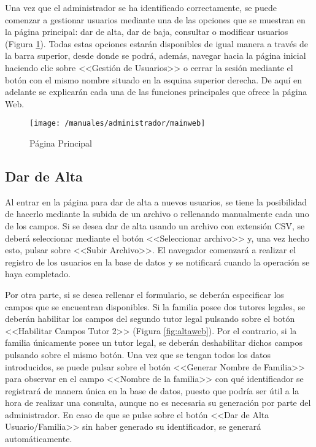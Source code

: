 Una vez que el administrador se ha identificado correctamente, se puede comenzar a gestionar usuarios mediante una de las opciones que se muestran en la página principal: dar de alta, dar de baja, consultar o modificar usuarios (Figura \ref{fig:indexweb}). Todas estas opciones estarán disponibles de igual manera a través de la barra superior, desde donde se podrá, además, navegar hacia la página inicial haciendo clic sobre <<Gestión de Usuarios>> o cerrar la sesión mediante el botón con el mismo nombre situado en la esquina superior derecha. De aquí en adelante se explicarán cada una de las funciones principales que ofrece la página Web.

\begin{figure}[!h]
	\begin{center}
		\texttt{[image: /manuales/administrador/mainweb]}
		\caption{Página Principal}
		\label{fig:indexweb}
	\end{center}
\end{figure}

\clearpage

\subsection*{Dar de Alta}
Al entrar en la página para dar de alta a nuevos usuarios, se tiene la posibilidad de hacerlo mediante la subida de un archivo o rellenando manualmente cada uno de los campos. Si se desea dar de alta usando un archivo con extensión \acs{CSV}, se deberá seleccionar mediante el botón <<Seleccionar archivo>> y, una vez hecho esto, pulsar sobre <<Subir Archivo>>. El navegador comenzará a realizar el registro de los usuarios en la base de datos y se notificará cuando la operación se haya completado.

Por otra parte, si se desea rellenar el formulario, se deberán especificar los campos que se encuentran disponibles. Si la familia posee dos tutores legales, se deberán habilitar los campos del segundo tutor legal pulsando sobre el botón <<Habilitar Campos Tutor 2>> (Figura \ref{fig:altaweb}). Por el contrario, si la familia únicamente posee un tutor legal, se deberán deshabilitar dichos campos pulsando sobre el mismo botón. Una vez que se tengan todos los datos introducidos, se puede pulsar sobre el botón <<Generar Nombre de Familia>> para observar en el campo <<Nombre de la familia>> con qué identificador se registrará de manera única en la base de datos, puesto que podría ser útil a la hora de realizar una consulta, aunque no es necesaria su generación por parte del administrador. En caso de que se pulse sobre el botón <<Dar de Alta Usuario/Familia>> sin haber generado su identificador, se generará automáticamente.

